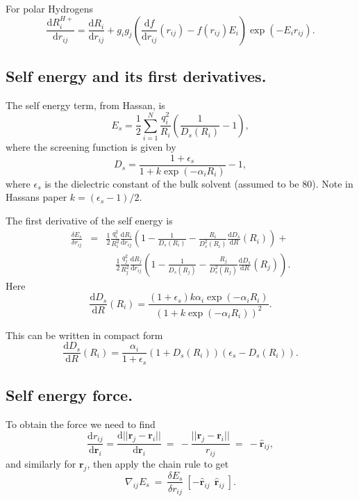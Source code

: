 \documentclass[a4paper,11pt,oneside]{article}
\begin{document}
For polar Hydrogens
\begin{equation}
\frac{\mathrm{d}R_i^{H+}}{\mathrm{d}r_{ij}} =
\frac{\mathrm{d}R_i}{\mathrm{d}r_{ij}} +
g_ig_j\left(\frac{\mathrm{d}f}{\mathrm{d}r_{ij}}(r_{ij})-f(r_{ij})E_i\right)\exp(-E_ir_{ij}).
\end{equation}

\subsection*{Self energy and its first derivatives.}
The self energy term, from Hassan, is
\begin{equation}
E_s =
\frac{1}{2}\sum_{i=1}^N\frac{q_i^2}{R_i}\left(\frac{1}{D_s(R_i)}-1\right),
\end{equation}
where the screening function is given by
\begin{equation}
D_s = \frac{1+\epsilon_s}{1+k\exp(-\alpha_iR_i)}-1,
\end{equation}
where $\epsilon_s$ is the dielectric constant of the bulk solvent (assumed to
be 80). Note in Hassans paper $k=(\epsilon_s-1)/2$.

The first derivative of the self energy is
\begin{eqnarray}
\nonumber\frac{\delta E_s}{\delta r_{ij}} &=&
\frac{1}{2}\frac{q_i^2}{R_i^2}\frac{\mathrm{d}R_i}{\mathrm{d}r_{ij}}\left(1-\frac{1}{D_s(R_i)}-\frac{R_i}{D_s^2(R_i)}\frac{\mathrm{d}D_s}{\mathrm{d}R}(R_i)\right)+\\
&&\quad\frac{1}{2}\frac{q_j^2}{R_j^2}\frac{\mathrm{d}R_j}{\mathrm{d}r_{ij}}\left(1-\frac{1}{D_s(R_j)}-\frac{R_j}{D_s^2(R_j)}\frac{\mathrm{d}D_s}{\mathrm{d}R}(R_j)\right).
\end{eqnarray}
Here
\begin{equation}
\frac{\mathrm{d}D_s}{\mathrm{d}R}(R_i) =
\frac{(1+\epsilon_s)k\alpha_i\exp(-\alpha_iR_i)}{\left(1+k\exp(-\alpha_iR_i)\right)^2}.
\end{equation}

This can be written in compact form
\begin{equation}
\label{dscompact}\frac{\mathrm{d}D_s}{\mathrm{d}R}(R_i) =
\frac{\alpha_i}{1+\epsilon_s}(1+D_s(R_i))(\epsilon_s-D_s(R_i)).
\end{equation}

\subsection*{Self energy force.}

To obtain the force we need to find
\begin{equation}
\frac{\mathrm{d}r_{ij}}{\mathrm{d}\mathbf{r}_i} =
\frac{\mathrm{d}||\mathbf{r}_j-\mathbf{r}_i||}{\mathrm{d}\mathbf{r}_i}~=~-\frac{||\mathbf{r}_j-\mathbf{r}_i||}{r_{ij}}~=~-\hat{\mathbf{r}}_{ij},
\end{equation}
and similarly for $\mathbf{r}_j$, then apply the chain rule to get
\begin{equation}
\label{nablaes}\nabla_{ij}E_s ~=~ \frac{\delta E_s}{\delta r_{ij}} ~[-\hat{\mathbf{r}}_{ij} ~~ \hat{\mathbf{r}}_{ij}~].
\end{equation}
\end{document}
